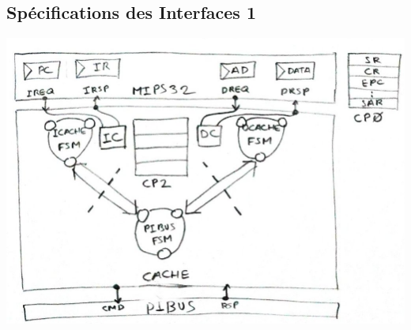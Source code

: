 \subsection{Spécifications des Interfaces 1}
\begin{center}
  \includegraphics[width=17cm]{cours3/pics/cache_internal.jpg}
\end{center}
